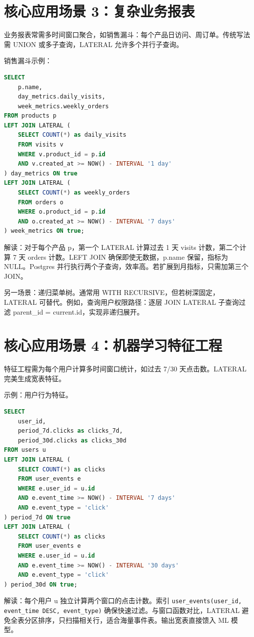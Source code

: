 \chapter{核心应用场景 3：复杂业务报表}
业务报表常需多时间窗口聚合，如销售漏斗：每个产品日访问、周订单。传统写法需 UNION 或多子查询，LATERAL 允许多个并行子查询。\par
销售漏斗示例：\par
\begin{lstlisting}[language=sql]
SELECT 
    p.name,
    day_metrics.daily_visits,
    week_metrics.weekly_orders
FROM products p
LEFT JOIN LATERAL (
    SELECT COUNT(*) as daily_visits
    FROM visits v 
    WHERE v.product_id = p.id
    AND v.created_at >= NOW() - INTERVAL '1 day'
) day_metrics ON true
LEFT JOIN LATERAL (
    SELECT COUNT(*) as weekly_orders
    FROM orders o
    WHERE o.product_id = p.id
    AND o.created_at >= NOW() - INTERVAL '7 days'
) week_metrics ON true;
\end{lstlisting}
解读：对于每个产品 p，第一个 LATERAL 计算过去 1 天 visits 计数，第二个计算 7 天 orders 计数。LEFT JOIN 确保即使无数据，p.name 保留，指标为 NULL。Postgres 并行执行两个子查询，效率高。若扩展到月指标，只需加第三个 JOIN。\par
另一场景：递归菜单树。通常用 WITH RECURSIVE，但若树深固定，LATERAL 可替代。例如，查询用户权限路径：逐层 JOIN LATERAL 子查询过滤 parent\_{}id = current.id，实现非递归展开。\par
\chapter{核心应用场景 4：机器学习特征工程}
特征工程需为每个用户计算多时间窗口统计，如过去 7/30 天点击数。LATERAL 完美生成宽表特征。\par
示例：用户行为特征。\par
\begin{lstlisting}[language=sql]
SELECT 
    user_id,
    period_7d.clicks as clicks_7d,
    period_30d.clicks as clicks_30d
FROM users u
LEFT JOIN LATERAL (
    SELECT COUNT(*) as clicks
    FROM user_events e
    WHERE e.user_id = u.id
    AND e.event_time >= NOW() - INTERVAL '7 days'
    AND e.event_type = 'click'
) period_7d ON true
LEFT JOIN LATERAL (
    SELECT COUNT(*) as clicks
    FROM user_events e
    WHERE e.user_id = u.id
    AND e.event_time >= NOW() - INTERVAL '30 days'
    AND e.event_type = 'click'
) period_30d ON true;
\end{lstlisting}
解读：每个用户 u 独立计算两个窗口的点击计数。索引 \texttt{user\_{}events(user\_{}id, event\_{}time DESC, event\_{}type)} 确保快速过滤。与窗口函数对比，LATERAL 避免全表分区排序，只扫描相关行，适合海量事件表。输出宽表直接馈入 ML 模型。\par
